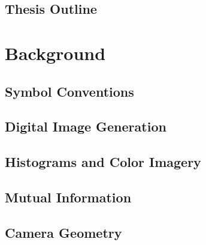 \documentclass[11pt]{report}
\begin{document}
\begin{doublespace}
\section{Thesis Outline}

\indent





\chapter{Background}
\label{Ch:Background}

\indent


\section{Symbol Conventions}

\indent


\section{Digital Image Generation}

\indent



\section{Histograms and Color Imagery}

\indent



\section{Mutual Information}

\indent



\section{Camera Geometry}


\end{doublespace}
\end{document}
